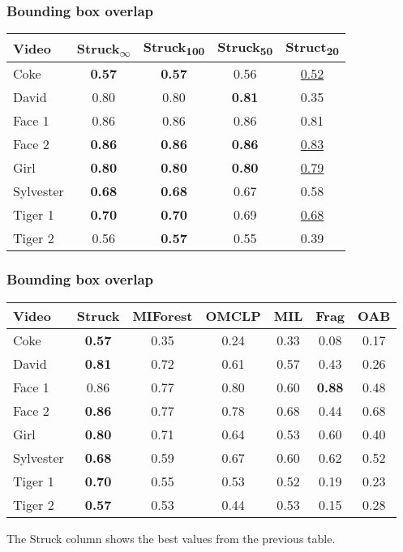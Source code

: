 \begin{frame}
    \frametitle{Bounding box overlap}
    \begin{tabular}{l c c c c }
        \toprule
        Video & Struck\textsubscript{$\infty$} & Struck\textsubscript{100} & Struck\textsubscript{50} & Struct\textsubscript{20} \\
        \midrule
        Coke      & \textbf{0.57} & \textbf{0.57} &         0.56  & \underline{0.52} \\
        David     &         0.80  &         0.80  & \textbf{0.81} &            0.35  \\
        Face 1    &         0.86  &         0.86  &         0.86  &            0.81  \\
        Face 2    & \textbf{0.86} & \textbf{0.86} & \textbf{0.86} & \underline{0.83} \\
        Girl      & \textbf{0.80} & \textbf{0.80} & \textbf{0.80} & \underline{0.79} \\
        Sylvester & \textbf{0.68} & \textbf{0.68} &         0.67  &            0.58  \\
        Tiger 1   & \textbf{0.70} & \textbf{0.70} &         0.69  & \underline{0.68} \\
        Tiger 2   &         0.56  & \textbf{0.57} &         0.55  &            0.39  \\
        \bottomrule
    \end{tabular}
\end{frame}

\begin{frame}
    \frametitle{Bounding box overlap}
    \begin{tabular}{l c c c c c c }
        \toprule
        Video & Struck & MIForest & OMCLP & MIL & Frag & OAB \\
        \midrule
        Coke      & \textbf{0.57} & 0.35 & 0.24 & 0.33 &         0.08  & 0.17 \\
        David     & \textbf{0.81} & 0.72 & 0.61 & 0.57 &         0.43  & 0.26 \\
        Face 1    &         0.86  & 0.77 & 0.80 & 0.60 & \textbf{0.88} & 0.48 \\
        Face 2    & \textbf{0.86} & 0.77 & 0.78 & 0.68 &         0.44  & 0.68 \\
        Girl      & \textbf{0.80} & 0.71 & 0.64 & 0.53 &         0.60  & 0.40 \\
        Sylvester & \textbf{0.68} & 0.59 & 0.67 & 0.60 &         0.62  & 0.52 \\
        Tiger 1   & \textbf{0.70} & 0.55 & 0.53 & 0.52 &         0.19  & 0.23 \\
        Tiger 2   & \textbf{0.57} & 0.53 & 0.44 & 0.53 &         0.15  & 0.28 \\
        \bottomrule
    \end{tabular}

    The Struck column shows the best values from the previous table.
\end{frame}

